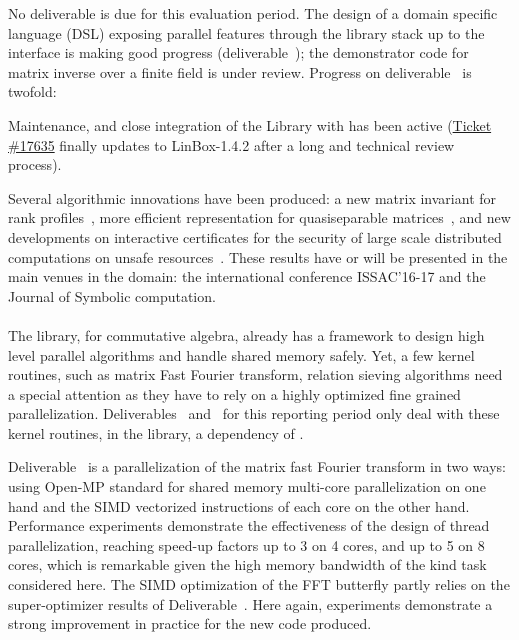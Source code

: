 \documentclass{deliverablereport}
\begin{document}
No deliverable is due for this evaluation period. The design of a
domain specific language (DSL) exposing parallel features through the
library stack up to the \Sage interface is making good progress
(deliverable~); the demonstrator code
for matrix inverse over a finite field is under review.
%
Progress on deliverable~ is twofold:
\begin{compactitem}
\item Maintenance, and close integration of the Library with \Sage has been
active (\href{https://trac.sagemath.org/ticket/17635}{Ticket \#17635} finally
updates \Sage to LinBox-1.4.2 after a long and technical review process).
\item Several algorithmic innovations have been produced: a new matrix invariant
  for rank profiles~\cite{DumPerSul:fcrpmgbd16}, more efficient
  representation for quasiseparable matrices~\cite{Pernet:cqm16,PerSto:tsegqm17}, and new developments on
  interactive certificates for the security of large scale distributed
  computations on unsafe
  resources~\cite{DumKalTho:lticmpdsm16,DumLucPer:cftearp17}. These results have or will
  be presented in the main venues in the domain:
  the international conference ISSAC'16-17 and the Journal of Symbolic computation.
\end{compactitem}

  \paragraph{}

  The \Singular library, for commutative algebra, already has a framework to
  design high level parallel algorithms and handle shared memory safely.
  Yet, a few kernel routines, such as matrix Fast Fourier
  transform, relation  sieving algorithms need a special attention as they have
  to rely on a highly optimized fine grained
  parallelization. Deliverables~
  and~ for this reporting period only deal with these
  kernel routines, in the \FLINT library, a dependency of \Singular.

  Deliverable~ is a parallelization of the matrix fast
  Fourier transform in two ways: using Open-MP standard for shared memory
  multi-core parallelization on one hand and the SIMD vectorized instructions of
  each core on the other hand. Performance experiments demonstrate the
  effectiveness of the design of thread parallelization, reaching speed-up
  factors up to 3 on 4 cores, and up to 5 on 8 cores, which is remarkable given
  the high memory bandwidth of the kind task considered here. The SIMD
  optimization of the FFT butterfly partly relies on the super-optimizer results
  of Deliverable~. Here again, experiments
  demonstrate a strong improvement in practice for the new code produced.
\end{document}
